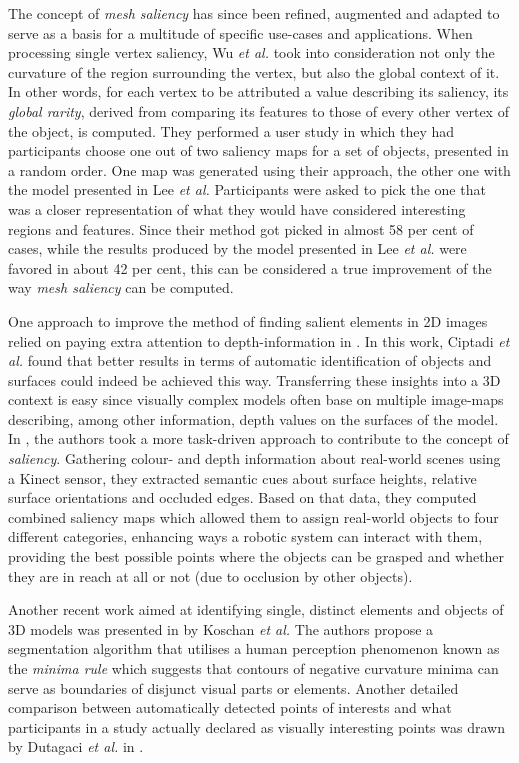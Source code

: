 The concept of \textit{mesh saliency} has since been refined, augmented and adapted to serve as a basis for a multitude of specific use-cases and applications. When processing single vertex saliency, Wu \textit{et al.} \cite{wu2013mesh} took into consideration not only the curvature of the region surrounding the vertex, but also the global context of it. In other words, for each vertex to be attributed a value describing its saliency, its \textit{global rarity}, derived from comparing its features to those of every other vertex of the object, is computed. They performed a user study in which they had participants choose one out of two saliency maps for a set of objects, presented in a random order. One map was generated using their approach, the other one with the model presented in Lee \textit{et al.} Participants were asked to pick the one that was a closer representation of what they would have considered interesting regions and features. Since their method got picked in almost 58 per cent of cases, while the results produced by the model presented in Lee \textit{et al.} were favored in about 42 per cent, this can be considered a true improvement of the way \textit{mesh saliency} can be computed.

One approach to improve the method of finding salient elements in 2D images relied on paying extra attention to depth-information in \cite{ciptadi2013depth}. In this work, Ciptadi \textit{et al.} found that better results in terms of automatic identification of objects and surfaces could indeed be achieved this way. Transferring these insights into a 3D context is easy since visually complex models often base on multiple image-maps describing, among other information, depth values on the surfaces of the model.
In \cite{potapova2011learning}, the authors took a more task-driven approach to contribute to the concept of \textit{saliency}. Gathering colour- and depth information about real-world scenes using a Kinect sensor, they extracted semantic cues about surface heights, relative surface orientations and occluded edges. Based on that data, they computed combined saliency maps which allowed them to assign real-world objects to four different categories, enhancing ways a robotic system can interact with them, providing the best possible points where the objects can be grasped and whether they are in reach at all or not (due to occlusion by other objects).

Another recent work aimed at identifying single, distinct elements and objects of 3D models was presented in \cite{koschan2003perception} by Koschan \textit{et al.} The authors propose a segmentation algorithm that utilises a human perception phenomenon known as the \textit{minima rule} which suggests that contours of negative curvature minima can serve as boundaries of disjunct visual parts or elements. Another detailed comparison between automatically detected points of interests and what participants in a study actually declared as visually interesting points was drawn by Dutagaci \textit{et al.} in \cite{dutagaci2012evaluation}.

